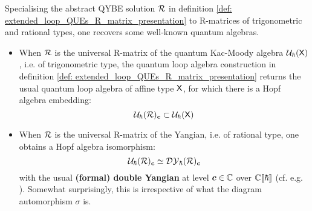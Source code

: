         \begin{example} \label{example: trigonometric_and_rational_loop_QUEs}
            Specialising the abstract QYBE solution $\mathcal{R}$ in definition \ref{def: extended_loop_QUEs_R_matrix_presentation} to R-matrices of trigonometric and rational types, one recovers some well-known quantum algebras.
            \begin{itemize}
                \item When $\mathcal{R}$ is the universal R-matrix of the quantum Kac-Moody algebra $\mathcal{U}_{\hbar}(\mathsf{X})$, i.e. of trigonometric type, the quantum loop algebra construction in definition \ref{def: extended_loop_QUEs_R_matrix_presentation} returns the usual quantum loop algebra of affine type $\mathsf{X}$, for which there is a Hopf algebra embedding:
                    $$\mathcal{U}_{\hbar}( \mathcal{R} )_{\boldsymbol{c}} \subset \mathcal{U}_{\hbar}(\mathsf{X})$$
                \item When $\mathcal{R}$ is the universal R-matrix of the Yangian, i.e. of rational type, one obtains a Hopf algebra isomorphism:
                    $$\mathcal{U}_{\hbar}( \mathcal{R} )_{\boldsymbol{c}} \simeq \mathcal{DY}_{\hbar}(\mathcal{R})_{\boldsymbol{c}}$$
                with the usual \textbf{(formal) double Yangian} at level $\boldsymbol{c} \in \mathbb{C}$ over $\mathbb{C}[\![\hbar]\!]$ (cf. e.g. \cite{molev_sugawara_operators_for_classical_lie_algebras}). Somewhat surprisingly, this is irrespective of what the diagram automorphism $\sigma$ is.
            \end{itemize}
        \end{example}

